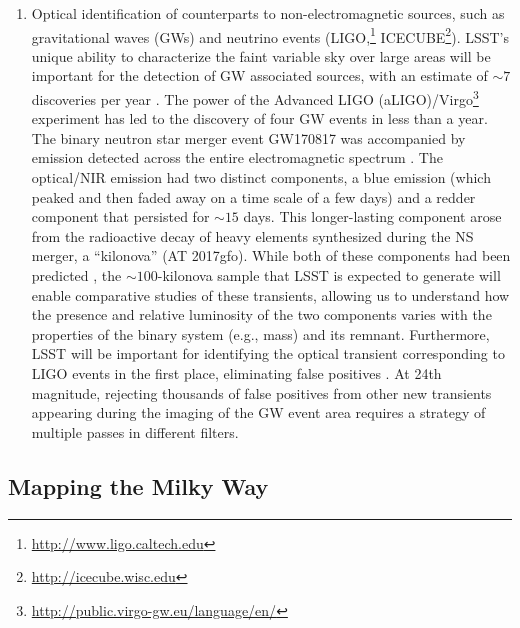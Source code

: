 \begin{enumerate}
\item Optical identification of counterparts to non-electromagnetic
  sources, such as gravitational waves (GWs) and neutrino events
  (LIGO,\footnote{\url{http://www.ligo.caltech.edu}}
  ICECUBE\footnote{\url{http://icecube.wisc.edu}}).  LSST's unique ability
  to characterize the faint variable sky over large areas will be
  important for the detection of GW associated sources, with an estimate
  of $\sim 7$ discoveries per year \citep{2018ApJ...852L...3S}.  The power
  of the Advanced LIGO
  (aLIGO)/Virgo\footnote{\url{http://public.virgo-gw.eu/language/en/}}
  experiment has led to the discovery
  of four GW events in less than a year. The binary
  neutron star merger event GW170817 was accompanied by emission
  detected across the entire electromagnetic spectrum \citep{2017ApJ...848L..12A}.
The optical/NIR emission had two distinct components, a blue emission
(which peaked and then faded away
on a time scale of a few days) and a redder component  that persisted
for $\sim 15$ days.  This longer-lasting component arose from the radioactive decay of heavy elements
synthesized during the NS merger, a ``kilonova'' (AT 2017gfo).
While both of these components had been predicted \citep{2017LRR....20....3M},
the $\sim 100$-kilonova sample that LSST is expected to generate will
enable comparative studies of these transients, allowing us to
understand how  the presence and relative luminosity of the two
components varies with the properties of the binary system (e.g., mass)
and its remnant.
  Furthermore, LSST will be important for identifying the optical transient
  corresponding to LIGO events in the first place, eliminating false
  positives \citep{2012ApJ...746...48M,2013ApJ...767..124N,2015ApJ...814...25C, 2017ApJ...849...12C}.
  At 24th
  magnitude, rejecting thousands of false positives from other new
  transients appearing during the imaging of the GW event area
  requires a strategy of multiple passes in different filters.

\end{enumerate}


\subsection{Mapping the Milky Way }

